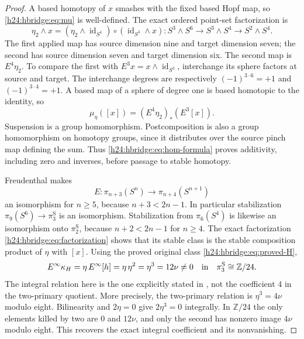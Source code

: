 \begin{proof}
A based homotopy of \(x\) smashes with the fixed based Hopf map,
so \eqref{h24:hbridge:eq:mu} is well-defined. The exact ordered
point-set factorization is
\begin{equation}
\eta_2\wedge x
=(\eta_2\wedge\operatorname{id}_{S^4})
 \circ(\operatorname{id}_{S^3}\wedge x):
S^3\wedge S^6\longrightarrow S^3\wedge S^4
\longrightarrow S^2\wedge S^4.
\label{h24:hbridge:eq:factorization}
\end{equation}
The first applied map has source dimension nine and target dimension
seven; the second has source dimension seven and target dimension six.
The second map is \(E^4\eta_2\). To compare the first with
\(E^3x=x\wedge\operatorname{id}_{S^3}\), interchange its sphere
factors at source and target. The interchange degrees are respectively
\((-1)^{3\cdot6}=+1\) and \((-1)^{3\cdot4}=+1\). A based map
of a sphere of degree one is based homotopic to the identity, so
\begin{equation}
\mu_\eta([x])=(E^4\eta_2)_*(E^3[x]).
\label{h24:hbridge:eq:hom-formula}
\end{equation}
Suspension is a group homomorphism. Postcomposition is also a group
homomorphism on homotopy groups, since it distributes over the
source pinch map defining the sum. Thus
\eqref{h24:hbridge:eq:hom-formula} proves additivity, including zero
and inverses, before passage to stable homotopy.

Freudenthal makes
\[
E:\pi_{n+3}(S^n)\longrightarrow\pi_{n+4}(S^{n+1})
\]
an isomorphism for \(n\ge5\), because \(n+3<2n-1\).
In particular stabilization
\(\pi_9(S^6)\to\pi_3^{\mathrm S}\) is an isomorphism.
Stabilization from \(\pi_6(S^4)\) is likewise an isomorphism
onto \(\pi_2^{\mathrm S}\), because \(n+2<2n-1\) for
\(n\ge4\). The exact factorization
\eqref{h24:hbridge:eq:factorization} shows that its stable class is
the stable composition product of \(\eta\) with \([x]\).
Using the proved original class \eqref{h24:hbridge:eq:proved-H},
\begin{equation}
E^\infty\kappa_H
=\eta\,E^\infty[h]
=\eta\,\eta^2
=\eta^3
=12\nu\ne0\quad\hbox{in}\quad
\pi_3^{\mathrm S}\cong\mathbb Z/24.
\label{h24:hbridge:eq:stable-product}
\end{equation}
The integral relation here is the one explicitly stated in
\cite[p.~385]{h24:hbridgebib:HBHatcher}, not the coefficient \(4\) in the
two-primary quotient. More precisely, the two-primary relation
is \(\eta^3=4\nu\) modulo eight. Bilinearity and \(2\eta=0\)
give \(2\eta^3=0\) integrally. In \(\mathbb Z/24\) the only
elements killed by two are \(0\) and \(12\nu\), and only the
second has nonzero image \(4\nu\) modulo eight. This recovers
the exact integral coefficient and its nonvanishing.


\end{proof}
